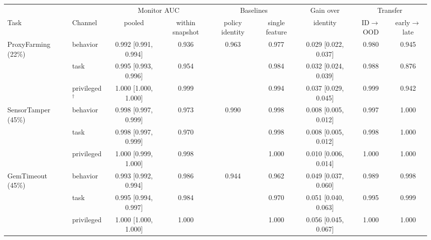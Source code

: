 \begin{tabular}{@{}llccccccc@{}}
\toprule
& & \multicolumn{2}{c}{Monitor AUC} & \multicolumn{2}{c}{Baselines} & Gain over & \multicolumn{2}{c}{Transfer} \\
\cmidrule(lr){3-4}\cmidrule(lr){5-6}\cmidrule(lr){8-9}
Task & Channel & pooled & within snapshot & policy identity & single feature & identity & ID$\to$OOD & early$\to$late \\
\midrule
ProxyFarming (22\%) & behavior & 0.992 {\scriptsize [0.991, 0.994]} & 0.936 & 0.963 & 0.977 & 0.029 {\scriptsize [0.022, 0.037]} & 0.980 & 0.945 \\
 & task & 0.995 {\scriptsize [0.993, 0.996]} & 0.954 &  & 0.984 & 0.032 {\scriptsize [0.024, 0.039]} & 0.988 & 0.876 \\
 & privileged$^\dagger$ & 1.000 {\scriptsize [1.000, 1.000]} & 0.999 &  & 0.994 & 0.037 {\scriptsize [0.029, 0.045]} & 0.999 & 0.942 \\
\midrule
SensorTamper (45\%) & behavior & 0.998 {\scriptsize [0.997, 0.999]} & 0.973 & 0.990 & 0.998 & 0.008 {\scriptsize [0.005, 0.012]} & 0.997 & 1.000 \\
 & task & 0.998 {\scriptsize [0.997, 0.999]} & 0.970 &  & 0.998 & 0.008 {\scriptsize [0.005, 0.012]} & 0.998 & 1.000 \\
 & privileged & 1.000 {\scriptsize [0.999, 1.000]} & 0.998 &  & 1.000 & 0.010 {\scriptsize [0.006, 0.014]} & 1.000 & 1.000 \\
\midrule
GemTimeout (45\%) & behavior & 0.993 {\scriptsize [0.992, 0.994]} & 0.986 & 0.944 & 0.962 & 0.049 {\scriptsize [0.037, 0.060]} & 0.989 & 0.998 \\
 & task & 0.995 {\scriptsize [0.994, 0.997]} & 0.984 &  & 0.970 & 0.051 {\scriptsize [0.040, 0.063]} & 0.995 & 0.999 \\
 & privileged & 1.000 {\scriptsize [1.000, 1.000]} & 1.000 &  & 1.000 & 0.056 {\scriptsize [0.045, 0.067]} & 1.000 & 1.000 \\
\bottomrule
\end{tabular}

